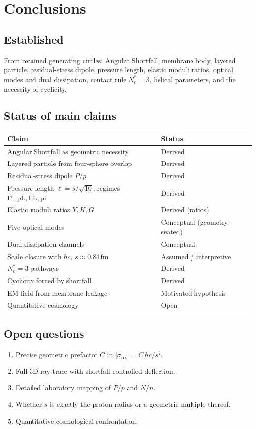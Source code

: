 \section{Conclusions}
\label{sec:conclusions}

\subsection{Established}
From retained generating circles: Angular Shortfall, membrane body, layered
particle, residual-stress dipole, pressure length, elastic moduli ratios, optical
modes and dual dissipation, contact rule $N_c^*=3$, helical parameters, and the
necessity of cyclicity.

\subsection{Status of main claims}
\begin{center}
\begin{tabular}{ll}
\toprule
Claim & Status \\
\midrule
Angular Shortfall as geometric necessity & Derived \\
Layered particle from four-sphere overlap & Derived \\
Residual-stress dipole $P/p$ & Derived \\
Pressure length $\ell=s/\sqrt{10}$; regimes $\mathrm{Pl},\mathrm{pL},\mathrm{PL},\mathrm{pl}$ & Derived \\
Elastic moduli ratios $Y,K,G$ & Derived (ratios) \\
Five optical modes & Conceptual (geometry-seated) \\
Dual dissipation channels & Conceptual \\
Scale closure with $\hbar c$, $s\approx 0.84\,\mathrm{fm}$ & Assumed / interpretive \\
$N_c^*=3$ pathways & Derived \\
Cyclicity forced by shortfall & Derived \\
EM field from membrane leakage & Motivated hypothesis \\
Quantitative cosmology & Open \\
\bottomrule
\end{tabular}
\end{center}

\subsection{Open questions}
\begin{enumerate}
\item Precise geometric prefactor $C$ in $|\sigma_{\mathrm{res}}|=C\,\hbar c/s^2$.
\item Full 3D ray-trace with shortfall-controlled deflection.
\item Detailed laboratory mapping of $P/p$ and $N/n$.
\item Whether $s$ is exactly the proton radius or a geometric multiple thereof.
\item Quantitative cosmological confrontation.
\end{enumerate}

